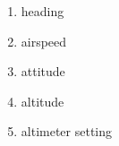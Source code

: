 \begin{enumerate}[label=\textbf{\arabic*},leftmargin=*,itemsep=0pt]
\item heading
\item airspeed
\item attitude
\item altitude
\item altimeter setting
\end{enumerate}
